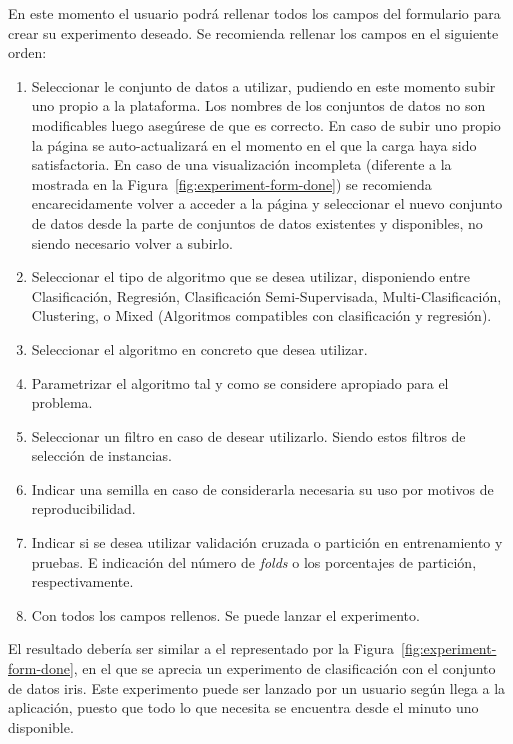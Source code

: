 En este momento el usuario podrá rellenar todos los campos del formulario para crear su experimento deseado. Se recomienda rellenar los campos en el siguiente orden:
\begin{enumerate}
\item Seleccionar le conjunto de datos a utilizar, pudiendo en este momento subir uno propio a la plataforma. Los nombres de los conjuntos de datos no son modificables luego asegúrese de que es correcto. En caso de subir uno propio la página se auto-actualizará en el momento en el que la carga haya sido satisfactoria. En caso de una visualización incompleta (diferente a la mostrada en la Figura~\ref{fig:experiment-form-done}) se recomienda encarecidamente volver a acceder a la página y seleccionar el nuevo conjunto de datos desde la parte de conjuntos de datos existentes y disponibles, no siendo necesario volver a subirlo.
\item Seleccionar el tipo de algoritmo que se desea utilizar, disponiendo entre Clasificación, Regresión, Clasificación Semi-Supervisada, Multi-Clasificación, Clustering, o Mixed (Algoritmos compatibles con clasificación y regresión).
\item Seleccionar el algoritmo en concreto que desea utilizar.
\item Parametrizar el algoritmo tal y como se considere apropiado para el problema.
\item Seleccionar un filtro en caso de desear utilizarlo. Siendo estos filtros de selección de instancias.
\item Indicar una semilla en caso de considerarla necesaria su uso por motivos de reproducibilidad.
\item Indicar si se desea utilizar validación cruzada o partición en entrenamiento y pruebas. E indicación del número de \textit{folds} o los porcentajes de partición, respectivamente.
\item Con todos los campos rellenos. Se puede lanzar el experimento.
\end{enumerate}

El resultado debería ser similar a el representado por la Figura~\ref{fig:experiment-form-done}, en el que se aprecia un experimento de clasificación con el conjunto de datos iris. Este experimento puede ser lanzado por un usuario según llega a la aplicación, puesto que todo lo que necesita se encuentra desde el minuto uno disponible.


